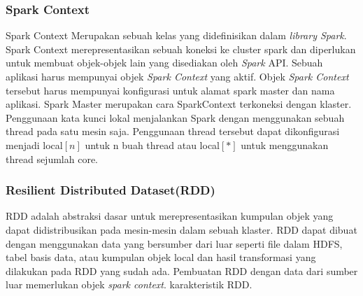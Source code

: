 \subsubsection{Spark Context}
Spark Context Merupakan sebuah kelas yang didefinisikan dalam \textit{library Spark}. Spark Context merepresentasikan sebuah koneksi ke cluster spark dan diperlukan untuk membuat objek-objek lain yang disediakan oleh \textit{Spark} API. Sebuah aplikasi harus mempunyai objek \textit{Spark Context} yang aktif. Objek \textit{Spark Context} tersebut harus mempunyai konfigurasi untuk alamat spark master dan nama aplikasi. Spark Master merupakan cara SparkContext terkoneksi dengan klaster. Penggunaan kata kunci lokal menjalankan Spark dengan menggunakan sebuah thread pada satu mesin saja. Penggunaan thread tersebut dapat dikonfigurasi menjadi local$[n]$ untuk n buah thread atau local$[*]$ untuk menggunakan thread sejumlah core.

\subsubsection{Resilient Distributed Dataset(RDD)}
RDD adalah abstraksi dasar untuk merepresentasikan kumpulan objek yang dapat didistribusikan pada mesin-mesin dalam sebuah klaster. RDD dapat dibuat dengan menggunakan data yang bersumber dari luar seperti file dalam HDFS, tabel basis data, atau kumpulan objek local dan hasil transformasi yang dilakukan pada RDD yang sudah ada. Pembuatan RDD dengan data dari sumber luar memerlukan objek \textit{spark context}. karakteristik RDD.

